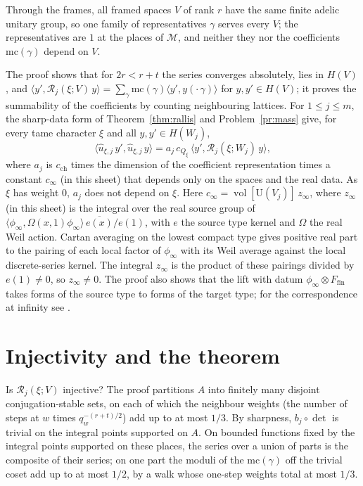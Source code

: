\documentclass[reqno]{amsart}
\theoremstyle{definition}
\theoremstyle{plain}
\newcommand{\Mch}{\mathcal{M}}
\newcommand{\Rc}{\mathcal{R}}
\newcommand{\U}{\mathrm{U}}
\newcommand{\vol}{\operatorname{vol}}
\newcommand{\cch}{c_{\mathrm{ch}}}
\newcommand{\uh}{\hat u}
\begin{document}
Through the frames, all framed spaces \(V\) of rank \(r\) have the same finite adelic unitary group, so one family of representatives \(\gamma\) serves every \(V\); the representatives are \(1\) at the places of \(\Mch\), and neither they nor the coefficients \(\mathrm{mc}(\gamma)\) depend on \(V\).

The proof shows that for \(2r < r + t\) the series converges absolutely, lies in \(H(V)\), and \(\langle y', \Rc_j(\xi; V)\, y\rangle = \sum_\gamma \mathrm{mc}(\gamma) \langle y', y(\cdot\,\gamma)\rangle\) for \(y, y' \in H(V)\); it proves the summability of the coefficients by counting neighbouring lattices.  For \(1 \le j \le m\), the sharp-data form of Theorem~\ref{thm:rallis} and Problem~\ref{pr:mass} give, for every tame character \(\xi\) and all \(y, y' \in H(W_j)\),
\[
  \langle \uh_{\xi,j}\, y', \uh_{\xi,j}\, y\rangle = a_j\, c_{Q_\xi}\, \langle y', \Rc_j(\xi; W_j)\, y\rangle ,
\]
where \(a_j\) is \(\cch\) times the dimension of the coefficient representation times a constant \(c_\infty\) (in this sheet) that depends only on the spaces and the real data.  As \(\xi\) has weight \(0\), \(a_j\) does not depend on \(\xi\).  Here \(c_\infty = \vol[\U(V_j)]\, z_\infty\), where \(z_\infty\) (in this sheet) is the integral over the real source group of \(\langle \phi_\infty, \Omega(x,1)\phi_\infty\rangle\, \overline{e(x)}/e(1)\), with \(e\) the source type kernel and \(\Omega\) the real Weil action.  Cartan averaging on the lowest compact type gives positive real part to the pairing of each local factor of \(\phi_\infty\) with its Weil average against the local discrete-series kernel.  The integral \(z_\infty\) is the product of these pairings divided by \(e(1) \ne 0\), so \(z_\infty \ne 0\).  The proof also shows that the lift with datum \(\phi_\infty \otimes F_{\mathrm{fin}}\) takes forms of the source type to forms of the target type; for the correspondence at infinity see \cite{Li90}.

\section{Injectivity and the theorem}\label{sec:theorem}

Is \(\Rc_j(\xi; V)\) injective?  The proof partitions \(A\) into finitely many disjoint conjugation-stable sets, on each of which the neighbour weights (the number of steps at \(w\) times \(q_w^{-(r+t)/2}\)) add up to at most \(1/3\).  By sharpness, \(b_j \circ \det\) is trivial on the integral points supported on \(A\).  On bounded functions fixed by the integral points supported on these places, the series over a union of parts is the composite of their series; on one part the moduli of the \(\mathrm{mc}(\gamma)\) off the trivial coset add up to at most \(1/2\), by a walk whose one-step weights total at most \(1/3\).
\end{document}
